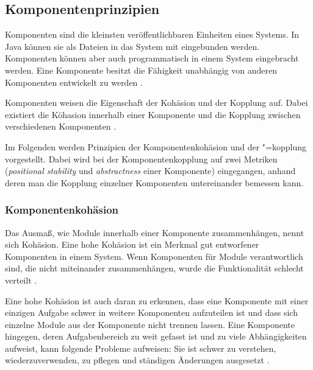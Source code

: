 \subsection{Komponentenprinzipien}
\label{sec:Komponentenprinzipien}

Komponenten sind die kleinsten veröffentlichbaren Einheiten eines Systems. In Java können sie als  Dateien in das System mit eingebunden werden. Komponenten können aber auch programmatisch in einem System eingebracht werden. Eine Komponente besitzt die Fähigkeit unabhängig von anderen Komponenten entwickelt zu werden \citep[vgl.][96]{martin2018}.

Komponenten weisen die Eigenschaft der Kohäsion und der Kopplung auf. Dabei existiert die Köhasion innerhalb einer Komponente und die Kopplung zwischen verschiedenen Komponenten \citep[vgl.][131]{voorhees2020}.


Im Folgenden werden Prinzipien der Komponentenkohäsion und der "=kopplung vorgestellt. Dabei wird bei der Komponentenkopplung auf zwei Metriken (\textit{positional stability} und \textit{abstractness} einer Komponente) eingegangen, anhand deren man die Kopplung einzelner Komponenten untereinander bemessen kann.

\subsubsection{Komponentenkohäsion}

Das Ausmaß, wie Module innerhalb einer Komponente zusammenhängen, nennt sich Kohäsion. Eine hohe Kohäsion ist ein Merkmal gut entworfener Komponenten in einem System. Wenn Komponenten für Module verantwortlich sind, die nicht miteinander zusammenhängen, wurde die Funktionalität schlecht verteilt \citep[vgl.][797]{gui2009}.


Eine hohe Kohäsion ist auch daran zu erkennen, dass eine Komponente mit einer einzigen Aufgabe schwer in weitere Komponenten aufzuteilen ist und dass sich einzelne Module aus der Komponente nicht trennen lassen. Eine Komponente hingegen, deren Aufgabenbereich zu weit gefasst ist und zu viele Abhängigkeiten aufweist, kann folgende Probleme aufweisen: Sie ist schwer zu verstehen, wiederzuverwenden, zu pflegen und ständigen Änderungen ausgesetzt \citep[vgl.][131]{voorhees2020}.

